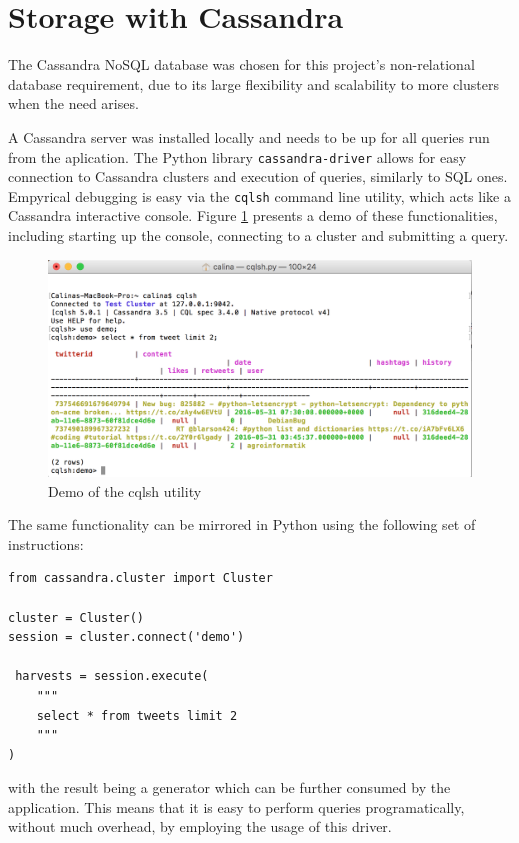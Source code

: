 \documentclass[12pt,a4paper,twoside]{report}
\begin{document}
\section{Storage with Cassandra}
The Cassandra NoSQL database was chosen for this project's non-relational database requirement, due to its large flexibility and scalability to more clusters when the need arises.

A Cassandra server was installed locally and needs to be up for all queries run from the aplication. The Python library \texttt{cassandra-driver} allows for easy connection to Cassandra clusters and execution of queries, similarly to SQL ones. Empyrical debugging is easy via the \texttt{cqlsh} command line utility, which acts like a Cassandra interactive console. Figure \ref{fig:cqlsh} presents a demo of these functionalities, including starting up the console, connecting to a cluster and submitting a query.

\begin{figure}[ht]
    \centering
\includegraphics[width=0.8\columnwidth]{img/cqlsh.png}
    \caption{Demo of the cqlsh utility}
    \label{fig:cqlsh}
\end{figure}

The same functionality can be mirrored in Python using the following set of instructions:

\lstset{basicstyle=\scriptsize}
\begin{lstlisting}
from cassandra.cluster import Cluster

cluster = Cluster()
session = cluster.connect('demo')

 harvests = session.execute(
    """
    select * from tweets limit 2
    """
)
\end{lstlisting}

with the result being a generator which can be further consumed by the application. This means that it is easy to perform queries programatically, without much overhead, by employing the usage of this driver.
\end{document}
